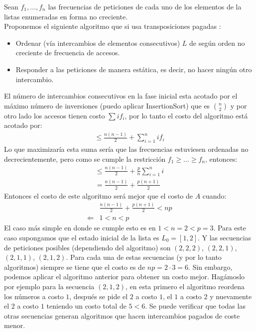 \documentclass[dcc,uchile]{fcfmcourse}
\begin{document}
\begin{problems}
\begin{enumerate}[(a)]
    Sean $f_{1},\ldots,f_{n}$ las frecuencias de peticiones de cada uno de los elementos de la listas enumeradas en forma no creciente.\\
    Proponemos el siguiente algoritmo que si usa transposiciones pagadas : 
    \begin{itemize}
        \item Ordenar (vía intercambios de elementos consecutivos) $L$ de según orden no creciente de frecuencia de accesos.
        \item Responder a las peticiones de manera estática, es decir, no hacer ningún otro intercambio.
    \end{itemize}
    El número de intercambios consecutivos en la fase inicial esta acotado por el máximo número de inversiones (puedo aplicar InsertionSort) que es $\binom{n}{2}$ y por otro lado los accesos tienen costo $\sum if_{i}$, por lo tanto el costo del algoritmo está acotado por:
    \begin{align*}
        \le \frac{n(n-1)}{2} + \sum_{i=1}^n if_{i}
    \end{align*}
    Lo que maximizaría esta suma sería que las frecuencias estuviesen ordenadas no decrecientemente, pero como se cumple la restricción $f_{1}\ge\ldots\ge f_{n}$, entonces:
    \begin{align*}
        \le \frac{n(n-1)}{2} + \frac{p}{n}\sum_{i=1}^n i\\
        =  \frac{n(n-1)}{2} + \frac{p(n+1)}{2}
    \end{align*}
    Entonces el costo de este algoritmo será mejor que el costo de $A$ cuando:
    \begin{align*}
        &\frac{n(n-1)}{2} + \frac{p(n+1)}{2} < np\\
        \Leftarrow & 1 < n < p
    \end{align*}
    El caso más simple en donde se cumple esto es en  $1< n=2 < p=3$. Para este caso supongamos que el estado inicial de la lista es $L_0 = [1,2]$. Y las secuencias de peticiones posibles (dependiendo del algoritmo) son $(2, 2, 2)$, $(2,2,1)$, $(2,1,1)$, $(2,1,2)$. Para cada una de estas secuencias (y por lo tanto algoritmos) siempre se tiene que el costo es de $np = 2\cdot 3 = 6$. Sin embargo, podemos aplicar el algoritmo anterior para obtener un costo mejor. Hagámoslo por ejemplo para la secuencia $(2, 1, 2)$, en esta primero el algoritmo reordena los números a costo $1$, después se pide el $2$ a costo $1$, el $1$ a costo $2$ y nuevamente el $2$ a costo $1$ teniendo un costo total de $5 < 6$. Se puede verificar que todas las otras secuencias generan algoritmos que hacen intercambios pagados de coste menor.

\end{enumerate}
\end{problems}
\end{document}
